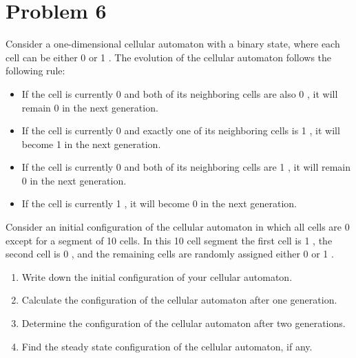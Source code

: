 \documentclass{article}
\begin{document}
\section*{Problem 6}
Consider a one-dimensional cellular automaton with a binary state, where each cell can be either 0 or 1 . The evolution of the cellular automaton follows the following rule:
\begin{itemize}
    \item If the cell is currently 0 and both of its neighboring cells are also 0 , it will remain 0 in the next generation.
    \item If the cell is currently 0 and exactly one of its neighboring cells is 1 , it will become 1 in the next generation.
    \item If the cell is currently 0 and both of its neighboring cells are 1 , it will remain 0 in the next generation.
    \item If the cell is currently 1 , it will become 0 in the next generation.
\end{itemize}
Consider an initial configuration of the cellular automaton in which all cells are 0 except for a segment of 10 cells. In this 10 cell segment the first cell is 1 , the second cell is 0 , and the remaining cells are randomly assigned either 0 or 1 .
\begin{enumerate}[label=(\alph*)]
    \item Write down the initial configuration of your cellular automaton.
    \item Calculate the configuration of the cellular automaton after one generation.
    \item Determine the configuration of the cellular automaton after two generations.
    \item Find the steady state configuration of the cellular automaton, if any.
\end{enumerate}
\end{document}
